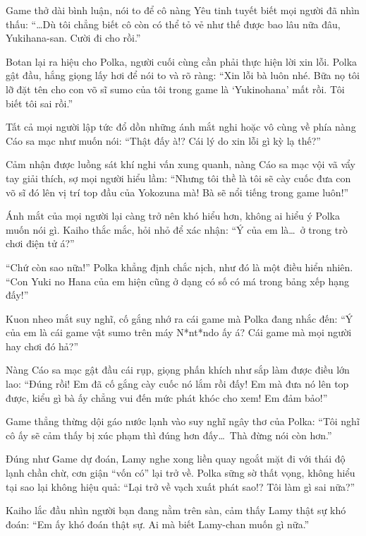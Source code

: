 \documentclass[../main.tex]{subfiles}
\begin{document}
Game thở dài bình luận, nói to để cô nàng Yêu tinh tuyết biết mọi người đã nhìn thấu: ``\dots Dù tôi chẳng biết cô còn có thể tỏ vẻ như thế được bao lâu nữa đâu, Yukihana-san. Cười đi cho rồi.''

Botan lại ra hiệu cho Polka, người cuối cùng cần phải thực hiện lời xin lỗi. Polka gật đầu, hắng giọng lấy hơi để nói to và rõ ràng: ``Xin lỗi bà luôn nhé. Bữa nọ tôi lỡ đặt tên cho con võ sĩ sumo của tôi trong game là `Yukinohana' mất rồi. Tôi biết tôi sai rồi.''

Tất cả mọi người lập tức đổ dồn những ánh mắt nghi hoặc vô cùng về phía nàng Cáo sa mạc như muốn nói: ``Thật đấy à!? Cái lý do xin lỗi gì kỳ lạ thế?''

Cảm nhận được luồng sát khí nghi vấn xung quanh, nàng Cáo sa mạc vội vã vẩy tay giải thích, sợ mọi người hiểu lầm: ``Nhưng tôi thề là tôi sẽ cày cuốc đưa con võ sĩ đó lên vị trí top đầu của Yokozuna mà! Bà sẽ nổi tiếng trong game luôn!''

Ánh mắt của mọi người lại càng trở nên khó hiểu hơn, không ai hiểu ý Polka muốn nói gì. Kaiho thắc mắc, hỏi nhỏ để xác nhận: ``Ý của em là\dots\ ở trong trò chơi điện tử á?''

``Chứ còn sao nữa!'' Polka khẳng định chắc nịch, như đó là một điều hiển nhiên. ``Con Yuki no Hana của em hiện cũng ở dạng có số có má trong bảng xếp hạng đấy!''


Kuon nheo mắt suy nghĩ, cố gắng nhớ ra cái game mà Polka đang nhắc đến: ``Ý của em là cái game vật sumo trên máy N*nt*ndo ấy á? Cái game mà mọi người hay chơi đó hả?''

Nàng Cáo sa mạc gật đầu cái rụp, giọng phấn khích như sắp làm được điều lớn lao: ``Đúng rồi! Em đã cố gắng cày cuốc nó lắm rồi đấy! Em mà đưa nó lên top được, kiểu gì bà ấy chẳng vui đến mức phát khóc cho xem! Em đảm bảo!''

Game thẳng thừng dội gáo nước lạnh vào suy nghĩ ngây thơ của Polka: ``Tôi nghĩ cô ấy sẽ cảm thấy bị xúc phạm thì đúng hơn đấy\dots\ Thà đừng nói còn hơn.''

Đúng như Game dự đoán, Lamy nghe xong liền quay ngoắt mặt đi với thái độ lạnh chần chừ, cơn giận ``vốn có'' lại trở về. Polka sững sờ thất vọng, không hiểu tại sao lại không hiệu quả: ``Lại trở về vạch xuất phát sao!? Tôi làm gì sai nữa?''

Kaiho lắc đầu nhìn người bạn đang nằm trên sàn, cảm thấy Lamy thật sự khó đoán: ``Em ấy khó đoán thật sự. Ai mà biết Lamy-chan muốn gì nữa.''
\end{document}
